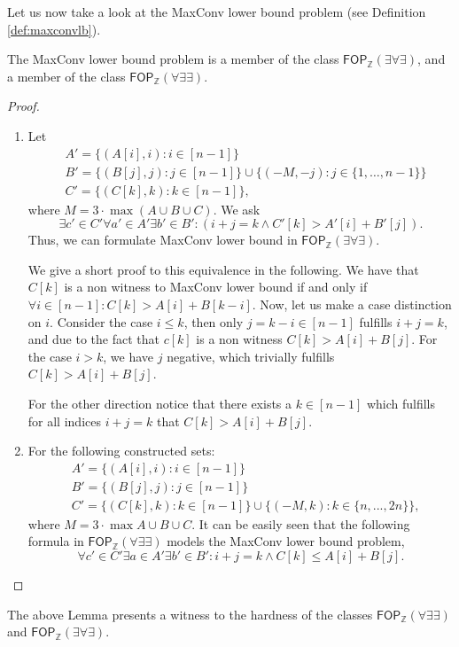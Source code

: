 Let us now take a look at the MaxConv lower bound problem (see Definition \ref{def:maxconvlb}).
\begin{lemma}
    The MaxConv lower bound problem is a member of the class $\mathsf{FOP}_{\mathbb{Z}}(\exists \forall \exists)$,
    and a member of the class $\mathsf{FOP}_{\mathbb{Z}}(\forall \exists \exists)$.
    \label{maxconvlb}
  \end{lemma}
  \begin{proof}
    \begin{enumerate}
  \item 
  Let 
  \begin{align*}
  &A'=\{ (A[i],i): i \in [n-1] \} \\
  &B'=\{(B[j],j): j\in [n-1] \} \cup \{(-M, -j): j \in \{1,\dots,n-1\} \}\\
  &C'=\{(C[k],k): k \in [n-1] \},
  \end{align*}
  where $M=3\cdot \max{(A\cup B \cup C)}.$
  We ask 
  $$\exists c' \in C' \forall a' \in A' \exists b' \in B': (i+j=k \land C'[k]>A'[i]+B'[j]).$$
  Thus, we can formulate MaxConv lower bound in $\mathsf{FOP}_{\mathbb{Z}}(\exists \forall \exists).$
  
  We give a short proof to this equivalence in the following. We have that $C[k]$ is a non witness to MaxConv lower bound if and only if  $\forall i \in [n-1]: C[k]>A[i]+B[k-i]$.
  Now, let us make a case distinction on $i$.
  Consider the case $i\leq k$, then only $j=k-i \in [n-1]$ fulfills $i+j=k$, and due to the fact 
  that $c[k]$ is a non witness $C[k]>A[i]+B[j]$.
  For the case $i>k$,  we have $j$ negative, which trivially fulfills $C[k]>A[i]+B[j]$.
  
  For the other direction notice that there exists a $k \in [n-1]$ which fulfills for all indices $i+j=k$ that $C[k]>A[i]+B[j]$.
  
  \item For the following constructed sets:
  \begin{align*}
  &A'=\{ (A[i],i): i \in [n-1] \}\\
  &B'=\{(B[j],j): j\in [n-1] \}\\
  &C'=\{(C[k],k): k \in [n-1] \} \cup \{(-M, k): k \in \{n,...,2n\} \},
  \end{align*}
  where $M=3\cdot \max A\cup B \cup C .$
  It can be easily seen that the following formula in $\mathsf{FOP}_{\mathbb{Z}}(\forall \exists \exists)$ models the MaxConv lower bound problem, 
  $$
  \forall c' \in C' \exists a \in A' \exists b' \in B': i+j=k \land C[k]\leq A[i]+B[j].
  $$
  \end{enumerate}
  \end{proof}
  The above Lemma presents a witness to the hardness of the classes $\mathsf{FOP}_{\mathbb{Z}}(\forall \exists \exists)$ and 
  $\mathsf{FOP}_{\mathbb{Z}}(\exists \forall \exists)$.
  
